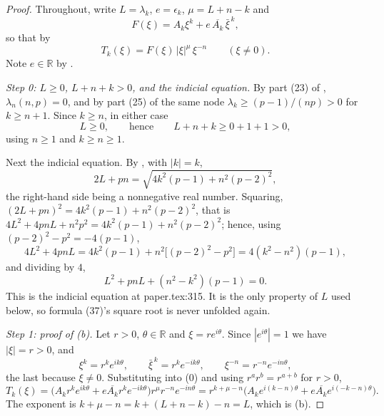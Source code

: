 \begin{proof}
Throughout, write $L=\lambda_k$, $e=\epsilon_k$, $\mu=L+n-k$ and
\[
  F(\xi)=A_k\xi^k+e\,\overline{A_k}\,\bar\xi^{\,k},
\]
so that by 
\begin{equation}\tag{0}
  T_k(\xi)=F(\xi)\,|\xi|^{\mu}\,\xi^{-n}\qquad(\xi\neq0).
\end{equation}
Note $e\in\mathbb{R}$ by .

\emph{Step 0: $L\ge0$, $L+n+k>0$, and the indicial equation.}  By part (23) of
, $\lambda_n(n,p)=0$, and by part (25) of the same
node $\lambda_k\ge(p-1)/(np)>0$ for $k\ge n+1$.  Since $k\ge n$, in either case
\begin{equation}\tag{1}
  L\ge0,\qquad\text{hence}\qquad L+n+k\ge0+1+1>0 ,
\end{equation}
using $n\ge1$ and $k\ge n\ge1$.

Next the indicial equation.  By , with $|k|=k$,
\[
  2L+pn=\sqrt{4k^2(p-1)+n^2(p-2)^2},
\]
the right-hand side being a nonnegative real number.  Squaring,
$(2L+pn)^2=4k^2(p-1)+n^2(p-2)^2$, that is
$4L^2+4pnL+n^2p^2=4k^2(p-1)+n^2(p-2)^2$; hence, using
$(p-2)^2-p^2=-4(p-1)$,
\[
  4L^2+4pnL=4k^2(p-1)+n^2\bigl[(p-2)^2-p^2\bigr]=4(k^2-n^2)(p-1),
\]
and dividing by $4$,
\begin{equation}\tag{I}
  L^2+pnL+(n^2-k^2)(p-1)=0 .
\end{equation}
This is the indicial equation at paper.tex:315.  It is the only property of $L$
used below, so formula (37)'s square root is never unfolded again.

\emph{Step 1: proof of (b).}  Let $r>0$, $\theta\in\mathbb{R}$ and
$\xi=re^{i\theta}$.  Since $|e^{i\theta}|=1$ we have $|\xi|=r>0$, and
\[
  \xi^k=r^ke^{ik\theta},\qquad \bar\xi^{\,k}=r^ke^{-ik\theta},\qquad
  \xi^{-n}=r^{-n}e^{-in\theta},
\]
the last because $\xi\neq0$.  Substituting into (0) and using $r^ar^b=r^{a+b}$
for $r>0$,
\[
  T_k(\xi)=\bigl(A_kr^ke^{ik\theta}+e\overline{A_k}r^ke^{-ik\theta}\bigr)
    r^{\mu}r^{-n}e^{-in\theta}
  =r^{k+\mu-n}\bigl(A_ke^{i(k-n)\theta}+e\overline{A_k}e^{i(-k-n)\theta}\bigr).
\]
The exponent is $k+\mu-n=k+(L+n-k)-n=L$, which is (b).


\end{proof}
